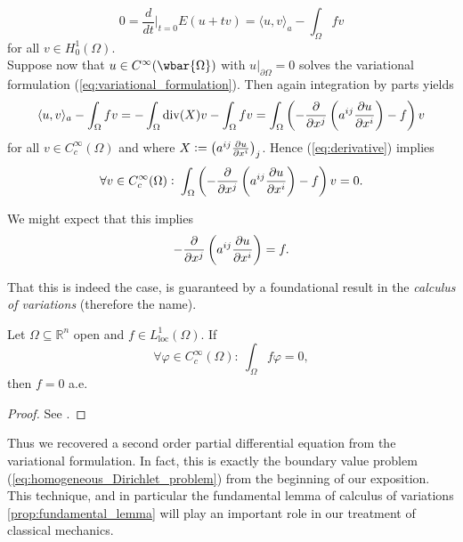 \begin{equation}
	\label{eq:derivative}
	0 = \frac{d}{dt}\bigg\vert_{t = 0} E(u + tv) = \langle u, v \rangle_a - \int_\Omega f v
\end{equation}
\noindent for all $v \in H^1_0(\Omega)$.\\
Suppose now that $u \in C^\infty(\wbar{\Omega})$ with $u\vert_{\partial \Omega} = 0$ solves the variational formulation (\ref{eq:variational_formulation}). Then again integration by parts yields
\begin{equation*}
	\langle u, v \rangle_a - \int_\Omega f v = -\int_\Omega \mathrm{div}(X) v - \int_\Omega fv = \int_\Omega \del[3]{-\frac{\partial}{\partial x^j}\del[3]{a^{ij}\frac{\partial u}{\partial x^i}} - f} v
\end{equation*}
\noindent for all $v \in C^\infty_c(\Omega)$ and where $X := \del[1]{a^{ij}\frac{\partial u}{\partial x^i}}_j$. Hence (\ref{eq:derivative}) implies 
\begin{equation*}
	\forall v \in C^\infty_c(\Omega): \> \int_\Omega \del[3]{-\frac{\partial}{\partial x^j}\del[3]{a^{ij}\frac{\partial u}{\partial x^i}} - f} v = 0.
\end{equation*}

We might expect that this implies 
\begin{equation*}
	-\frac{\partial}{\partial x^j}\del[3]{a^{ij}\frac{\partial u}{\partial x^i}} = f.
\end{equation*}

That this is indeed the case, is guaranteed by a foundational result in the \emph{calculus of variations} (therefore the name).

\begin{proposition}
	\label{prop:fundamental_lemma}
	Let $\Omega \subseteq \mathbb{R}^n$ open and $f \in L^1_{\mathrm{loc}}(\Omega)$. If
	\begin{equation*}
		\forall \varphi \in C^\infty_c(\Omega): \> \int_\Omega f\varphi = 0,
	\end{equation*}
	\noindent then $f = 0$ a.e.
\end{proposition}

\begin{proof}
	See \cite[40]{struwe:fa:2014}.
\end{proof}

Thus we recovered a second order partial differential equation from the variational formulation. In fact, this is exactly the boundary value problem (\ref{eq:homogeneous_Dirichlet_problem}) from the beginning of our exposition. This technique, and in particular the fundamental lemma of calculus of variations \ref{prop:fundamental_lemma} will play an important role in our treatment of classical mechanics.

